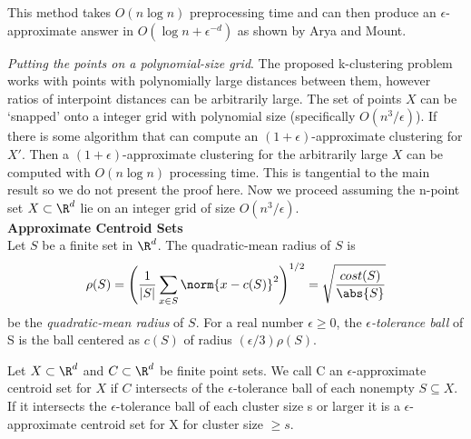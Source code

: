 This method takes $O(n \log n)$ preprocessing time and can then produce an $\epsilon$-approximate answer in $O( \log n + \epsilon^{-d})$ as shown by Arya and Mount.

\noindent \emph{Putting the points on a polynomial-size grid}. The proposed k-clustering problem works with points with polynomially large distances between them, however ratios of interpoint distances can be arbitrarily large. The set of points $X$ can be `snapped' onto a integer grid with polynomial size (specifically $O(n^3/\epsilon)$). If there is some algorithm that can compute an $(1+\epsilon)$-approximate clustering for $X'$. Then a $(1+\epsilon)$-approximate clustering for the arbitrarily large $X$ can be computed with $O(n \log n)$ processing time. This is tangential to the main result so we do not present the proof here. Now we proceed assuming the n-point set $X \subset \R^d$ lie on an integer grid of size $O(n^3/\epsilon)$.\\

\noindent \textbf{Approximate Centroid Sets}\\
Let $S$ be a finite set in $\R^d$. The quadratic-mean radius of $S$ is
\begin{align}
    \rho(S)  = \left( \frac{1}{|S|}\sum_{x\in S}\norm{x-c(S)}^2\right)^{1/2}
    = \sqrt{\frac{cost(S)}{\abs{S}}}
\end{align} 
be the \emph{quadratic-mean radius} of $S$. For a real number $\epsilon \geq 0$, the \emph{$\epsilon$-tolerance ball} of S is the ball centered as $c(S)$ of radius $(\epsilon/3)\rho(S)$.
\begin{definition}
Let $X \subset \R^d$ and $C \subset \R^d$ be finite point sets. We call C an $\epsilon$-approximate centroid set for $X$ if $C$ intersects of the $\epsilon$-tolerance ball of each nonempty $S \subseteq X$. If it intersects the $\epsilon$-tolerance ball  of each cluster size s or larger it is a $\epsilon$-approximate centroid set for X for cluster size $\geq s$.
\end{definition}

